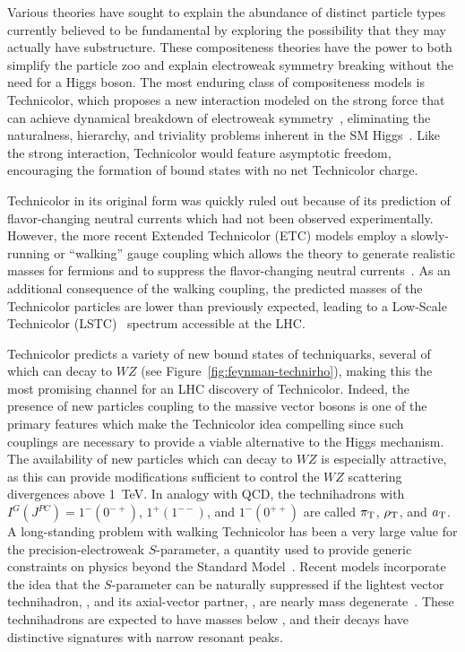 Various theories have sought to explain the abundance of distinct particle types currently believed to be fundamental by exploring the possibility that they may actually have substructure.  These compositeness theories have the power to both simplify the particle zoo and explain electroweak symmetry breaking without the need for a Higgs boson.  The most enduring class of compositeness models is Technicolor, which proposes a new interaction modeled on the strong force that can achieve dynamical breakdown of electroweak symmetry~\cite{Weinberg:1979bn,Susskind:1978ms}, eliminating the naturalness, hierarchy, and triviality problems inherent in the SM Higgs~\cite{Lane:2000pa}. Like the strong interaction, Technicolor would feature asymptotic freedom, encouraging the formation of bound states with no net Technicolor charge.

Technicolor in its original form was quickly ruled out because of its prediction of flavor-changing neutral currents which had not been observed experimentally.  However, the more recent Extended Technicolor (ETC) models employ a slowly-running or ``walking'' gauge coupling which allows the theory to generate realistic masses for fermions and to suppress the flavor-changing neutral currents~\cite{Holdom:1981rm}. As an additional consequence of the walking coupling, the predicted masses of the Technicolor particles are lower than previously expected, leading to  a Low-Scale Technicolor (LSTC)~\cite{Eichten:1996dx} spectrum accessible at the LHC.

Technicolor predicts a variety of new bound states of techniquarks, several of which can decay to $WZ$ (see Figure~\ref{fig:feynman-technirho}), making this the most promising channel for an LHC discovery of Technicolor.  Indeed, the presence of new particles coupling to the massive vector bosons is one of the primary features which make the Technicolor idea compelling since such couplings are necessary to provide a viable alternative to the Higgs mechanism.  The availability of new particles which can decay to $WZ$ is especially attractive, as this can provide modifications sufficient to control the $WZ$ scattering divergences above \SI{1}{\TeV}.  In analogy with QCD, the technihadrons with $I^G(J^{PC}) = 1^-(0^{-+})$, $1^+(1^{--})$, and $1^-(0^{++})$ are called $\pi_\mathrm{T}$, $\rho_\mathrm{T}$, and $a_\mathrm{T}$.  A long-standing problem with walking Technicolor has been a very large value for the precision-electroweak $S$-parameter, a quantity used to provide generic constraints on physics beyond the Standard Model~\cite{Peskin:1990zt}. Recent  models incorporate the idea that the $S$-parameter can be naturally suppressed if the lightest vector technihadron, \technirho, and its axial-vector partner, \technia, are nearly mass degenerate~\cite{Lane:2002sm}.  These technihadrons are expected to have masses below , and their decays have distinctive signatures with narrow resonant peaks.


